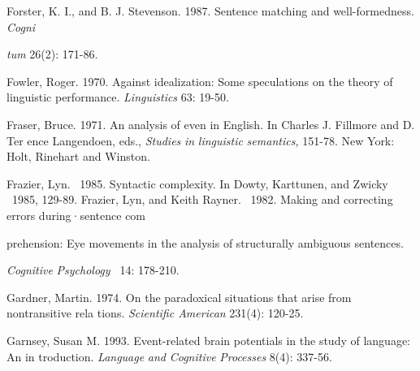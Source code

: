\begin{styleStandard}
Forster, K. I., and B. J. Stevenson. 1987. Sentence matching and well-formedness. \textit{Cogni\-}
\end{styleStandard}


\begin{styleStandard}
\textit{t}\textit{u}\textit{m}\textit{ }26(2): 171-86.
\end{styleStandard}


\begin{styleStandard}
Fowler, Roger. 1970. Against idealization: Some speculations on the theory of linguistic performance. \textit{Linguistics}\textit{ }63: 19-50.
\end{styleStandard}


\begin{styleStandard}
Fraser, Bruce. 1971. An analysis of {\textquotedbl}even{\textquotedbl} in English. In Charles J. Fillmore and D. Ter\- ence Langendoen, eds., \textit{Studies}\textit{ }\textit{in}\textit{ }\textit{linguistic}\textit{ }\textit{semantics,}\textit{ }151-78. New York: Holt, Rinehart and Winston.
\end{styleStandard}


\begin{styleStandard}
Frazier, Lyn. \ 1985. Syntactic complexity. In Dowty, Karttunen, and Zwicky \ 1985, 129-89. Frazier, Lyn, and Keith Rayner. \ 1982. Making and correcting errors during·sentence com\-
\end{styleStandard}


\begin{styleStandard}
prehension: Eye movements in the analysis of structurally ambiguous sentences.
\end{styleStandard}


\begin{styleStandard}
\textit{Cognitive}\textit{ }\textit{Psychology }\textit{\ }14: 178-210.
\end{styleStandard}


\begin{styleStandard}
Gardner, Martin. 1974. On the paradoxical situations that arise from nontransitive rela\- tions. \textit{Scientific American}\textit{ }231(4): 120-25.
\end{styleStandard}


\begin{styleStandard}
Garnsey, Susan M. 1993. Event-related brain potentials in the study of language: An in\- troduction. \textit{Language}\textit{ }\textit{and}\textit{ }\textit{Cognitive}\textit{ }\textit{Processes}\textit{ }8(4): 337-56.
\end{styleStandard}


